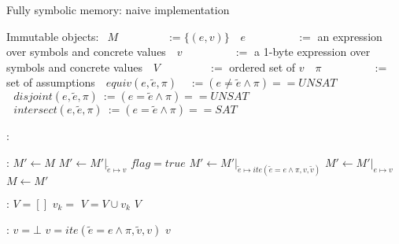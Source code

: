 \documentclass{article}
\begin{document}
\begin{algorithm}
  \normalsize

  \caption{Fully symbolic memory: naive implementation}
  \begin{algorithmic}
  	\State Immutable objects:
  	\State $~~M~~~~~~~~~~~~~~~~~~~\,:= \{(e,v)\}$ 
  	\State $~~~e~~~~~~~~~~~~~~~~~~~\,~:=$ an expression over symbols and concrete values
  	\State $~~~v~~~~~~~~~~~~~~~~~~~~\,:=$ a 1-byte expression over symbols and concrete values
  	\State $~~~V~~~~~~~~~~~~~~~~~~~\,:=$ ordered set of $v$
  	\State $~~~\pi~~~~~~~~~~~~~~~~~~~~\,:=$ set of assumptions
  	\State $~~~equiv(e, \widetilde{e}, \pi)~~~~\,:= (e \not = \widetilde{e} \wedge \pi) == UNSAT$ 
  	\State $~~~disjoint(e, \widetilde{e}, \pi)~:=  (e = \widetilde{e} \wedge \pi) == UNSAT$ 
  	\State $~~~intersect(e, \widetilde{e}, \pi)~:=  (e = \widetilde{e} \wedge \pi) == SAT$ 

  \end{algorithmic}

  \bigskip
  
  \begin{algorithmic}[1]
	:
			\State {}
		\EndFor
	\EndFunction
  \end{algorithmic}


  \bigskip

  \begin{algorithmic}[1]
	:
		\State $M'  \leftarrow M$
	    		\State $M' \leftarrow M'\vert_{\widetilde{e} \mapsto v}$
	    		\State $flag = true$
	    	\Else
	    		\State $M' \leftarrow M'\vert_{\widetilde{e} \mapsto ite(\widetilde{e} = e \wedge \pi, v, \widetilde{v})}$
	    	\EndIf
	    \EndFor
	    	\State $M' \leftarrow M'\vert_{e \mapsto v}$
	    \EndIf
	    \State $M  \leftarrow M'$
	\EndFunction
  \end{algorithmic}
  
  \bigskip

  \begin{algorithmic}[1]
	:
		\State $V = []$ 
			\State $v_k = $ 
			\State $V = V \cup v_k$
		\EndFor
		\State \Return $V$
	\EndFunction
  \end{algorithmic}

  \bigskip

  \begin{algorithmic}[1]
	:
		\State $v = \bot$ 
				\State $v = ite(\widetilde{e} = e \wedge \pi, \widetilde{v}, v)$
			\EndIf
		\EndFor
		\State \Return $v$
	\EndFunction
  \end{algorithmic}
  \bigskip
  
\end{algorithm}
\end{document}
